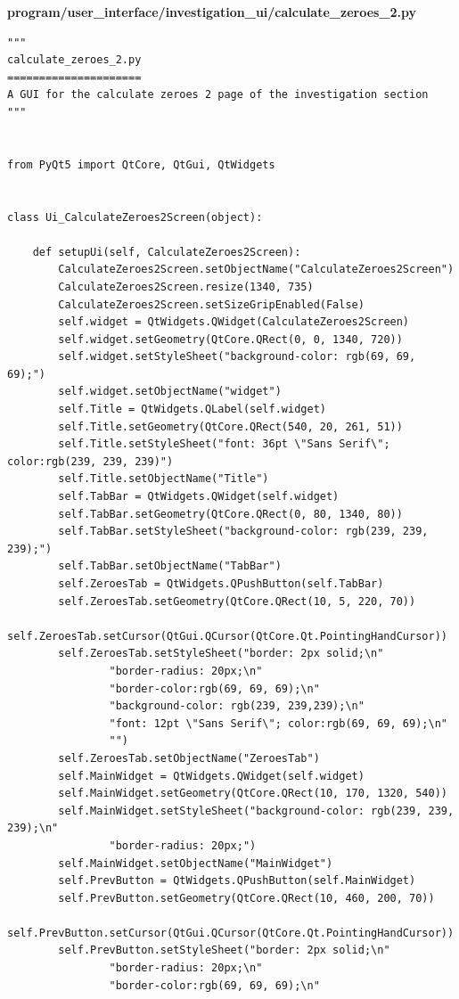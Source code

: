 \documentclass{article}
\begin{document}
\textbf{program/user\_interface/investigation\_ui/calculate\_zeroes\_2.py}
\begin{lstlisting}
"""
calculate_zeroes_2.py
=====================
A GUI for the calculate zeroes 2 page of the investigation section
"""


from PyQt5 import QtCore, QtGui, QtWidgets


class Ui_CalculateZeroes2Screen(object):

    def setupUi(self, CalculateZeroes2Screen):
        CalculateZeroes2Screen.setObjectName("CalculateZeroes2Screen")
        CalculateZeroes2Screen.resize(1340, 735)
        CalculateZeroes2Screen.setSizeGripEnabled(False)
        self.widget = QtWidgets.QWidget(CalculateZeroes2Screen)
        self.widget.setGeometry(QtCore.QRect(0, 0, 1340, 720))
        self.widget.setStyleSheet("background-color: rgb(69, 69, 69);")
        self.widget.setObjectName("widget")
        self.Title = QtWidgets.QLabel(self.widget)
        self.Title.setGeometry(QtCore.QRect(540, 20, 261, 51))
        self.Title.setStyleSheet("font: 36pt \"Sans Serif\"; color:rgb(239, 239, 239)")
        self.Title.setObjectName("Title")
        self.TabBar = QtWidgets.QWidget(self.widget)
        self.TabBar.setGeometry(QtCore.QRect(0, 80, 1340, 80))
        self.TabBar.setStyleSheet("background-color: rgb(239, 239, 239);")
        self.TabBar.setObjectName("TabBar")
        self.ZeroesTab = QtWidgets.QPushButton(self.TabBar)
        self.ZeroesTab.setGeometry(QtCore.QRect(10, 5, 220, 70))
        self.ZeroesTab.setCursor(QtGui.QCursor(QtCore.Qt.PointingHandCursor))
        self.ZeroesTab.setStyleSheet("border: 2px solid;\n"
                "border-radius: 20px;\n"
                "border-color:rgb(69, 69, 69);\n"
                "background-color: rgb(239, 239,239);\n"
                "font: 12pt \"Sans Serif\"; color:rgb(69, 69, 69);\n"
                "")
        self.ZeroesTab.setObjectName("ZeroesTab")
        self.MainWidget = QtWidgets.QWidget(self.widget)
        self.MainWidget.setGeometry(QtCore.QRect(10, 170, 1320, 540))
        self.MainWidget.setStyleSheet("background-color: rgb(239, 239, 239);\n"
                "border-radius: 20px;")
        self.MainWidget.setObjectName("MainWidget")
        self.PrevButton = QtWidgets.QPushButton(self.MainWidget)
        self.PrevButton.setGeometry(QtCore.QRect(10, 460, 200, 70))
        self.PrevButton.setCursor(QtGui.QCursor(QtCore.Qt.PointingHandCursor))
        self.PrevButton.setStyleSheet("border: 2px solid;\n"
                "border-radius: 20px;\n"
                "border-color:rgb(69, 69, 69);\n"

\end{lstlisting}
\end{document}
